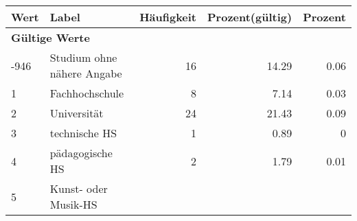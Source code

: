      \begin{longtable}{lXrrr}
     \toprule
     \textbf{Wert} & \textbf{Label} & \textbf{Häufigkeit} & \textbf{Prozent(gültig)} & \textbf{Prozent} \\
     \endhead
     \midrule
     \multicolumn{5}{l}{\textbf{Gültige Werte}}\\

     -946 &
     \multicolumn{1}{X}{ Studium ohne nähere Angabe   } &


       \num{16} &
       \num[round-mode=places,round-precision=2]{14.29} &
         \num[round-mode=places,round-precision=2]{0.06} \\

     1 &
     \multicolumn{1}{X}{ Fachhochschule   } &


       \num{8} &
       \num[round-mode=places,round-precision=2]{7.14} &
         \num[round-mode=places,round-precision=2]{0.03} \\

     2 &
     \multicolumn{1}{X}{ Universität   } &


       \num{24} &
       \num[round-mode=places,round-precision=2]{21.43} &
         \num[round-mode=places,round-precision=2]{0.09} \\

     3 &
     \multicolumn{1}{X}{ technische HS   } &


       \num{1} &
       \num[round-mode=places,round-precision=2]{0.89} &
         \num[round-mode=places,round-precision=2]{0} \\

     4 &
     \multicolumn{1}{X}{ pädagogische HS   } &


       \num{2} &
       \num[round-mode=places,round-precision=2]{1.79} &
         \num[round-mode=places,round-precision=2]{0.01} \\

     5 &
     \multicolumn{1}{X}{ Kunst- oder Musik-HS   } &



\end{longtable}
